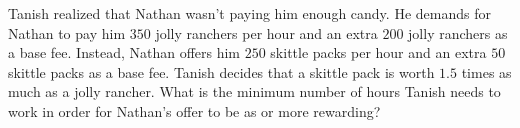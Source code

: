 Tanish realized that Nathan wasn't paying him enough candy. He demands for Nathan to pay him $350$ jolly ranchers per hour and an extra $200$ jolly ranchers as a base fee. Instead, Nathan offers him $250$ skittle packs per hour and an extra $50$ skittle packs as a base fee. Tanish decides that a skittle pack is worth $1.5$ times as much as a jolly rancher. What is the minimum number of hours Tanish needs to work in order for Nathan's offer to be as or more rewarding?
